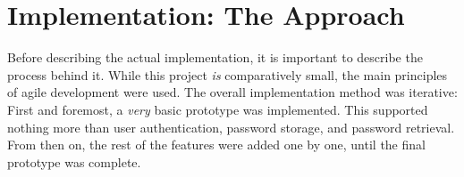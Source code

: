 \chapter{Implementation: The Approach}
	Before describing the actual implementation, it is important to describe the process behind it. While this project \emph{is} comparatively small, the main principles of agile development were used. The overall implementation method was iterative: First and foremost, a \emph{very} basic prototype was implemented. This supported nothing more than user authentication, password storage, and password retrieval. From then on, the rest of the features were added one by one, until the final prototype was complete.